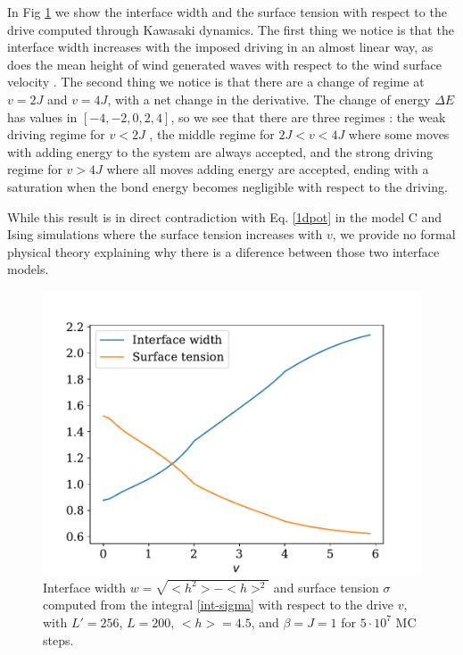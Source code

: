 In Fig \ref{fig-correl-drive} we show the interface width and the surface tension with respect to the drive computed through Kawasaki dynamics. The first thing we notice is that the interface width increases with the imposed driving in an almost linear way, as does the mean height of wind generated waves with respect to the wind surface velocity \cite{maat_roughness_1991}.
The second thing we notice is that there are a change of regime at $v=2J$ and $v=4J$, with a net change in the derivative. The change of energy $\Delta E$ has values in $[-4,-2,0,2,4]$, so we see that there are three regimes : the weak driving regime for $v \less 2J$ , the middle regime for $2J \less v \less 4J$ where some moves with adding energy to the system are always accepted, and the strong driving regime for $v \greater 4J$ where all moves adding energy are accepted, ending with a saturation when the bond energy becomes negligible with respect to the driving. 
 
While this result is in direct contradiction with Eq. \eqref{1dpot} in the model C and Ising simulations \cite{smith_interfaces_2008-1,smith_lateral_2010} where the surface tension increases with $v$, we provide no formal physical theory explaining why there is a diference between those two interface models. 

\begin{figure}
    \centering
    \includegraphics[width=0.7\linewidth]{drivenC/tension-drive.pdf}
    \caption{Interface width $w=\sqrt{<h^2>-<h>^2}$ and surface tension $\sigma$ computed from the integral \eqref{int-sigma} with respect to the drive $v$,  with $L'=256$, $L=200$, $<h> = 4.5$, and $\beta = J = 1$ for $5 \cdot 10^7$ MC steps.}
    \label{fig-correl-drive}    
\end{figure}


